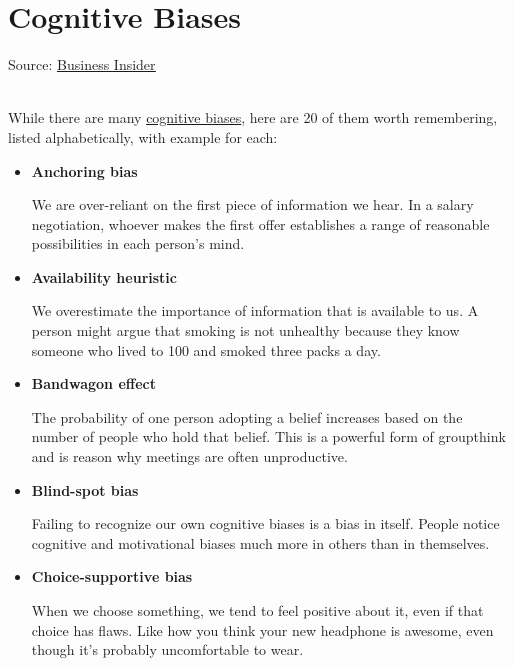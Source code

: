 \section{Cognitive Biases}

Source: \href{https://www.businessinsider.com/cognitive-biases-that-affect-decisions-2015-8}{\underline{Business Insider}}\\\

While there are many \href{https://en.wikipedia.org/wiki/List_of_cognitive_biases}{\underline{cognitive biases}}, here are 20 of them worth remembering, listed alphabetically, with example for each:

\begin{itemize}
    \item \textbf{Anchoring bias}
    
    We are over-reliant on the first piece of information we hear.  In a salary negotiation, whoever makes the first offer establishes a range of reasonable possibilities in each person's mind.
    
    \item \textbf{Availability heuristic}
    
    We overestimate the importance of information that is available to us.  A person might argue that smoking is not unhealthy because they know someone who lived to 100 and smoked three packs a day.
    
    \item \textbf{Bandwagon effect}
    
    The probability of one person adopting a belief increases based on the number of people who hold that belief.  This is a powerful form of groupthink and is reason why meetings are often unproductive.
    
    
    \item \textbf{Blind-spot bias}
    
    Failing to recognize our own cognitive biases is a bias in itself.  People notice cognitive and motivational biases much more in others than in themselves.
    
    \item \textbf{Choice-supportive bias}
    
    When we choose something, we tend to feel positive about it, even if that choice has flaws.  Like how you think your new headphone is awesome, even though it's probably uncomfortable to wear.
    

\end{itemize}

